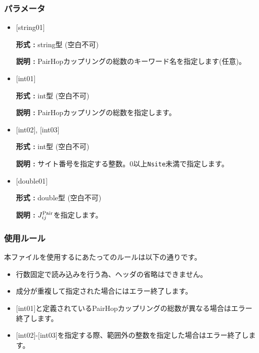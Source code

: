 \subsubsection{パラメータ}
 \begin{itemize}

   \item  $[$string01$]$
   
    {\bf 形式 :} string型 (空白不可)

   {\bf 説明 :} PairHopカップリングの総数のキーワード名を指定します(任意)。

   \item  $[$int01$]$
   
    {\bf 形式 :} int型 (空白不可)

   {\bf 説明 :} PairHopカップリングの総数を指定します。

  \item  $[$int02$]$, $[$int03$]$
  
 {\bf 形式 :} int型 (空白不可)

{\bf 説明 :} サイト番号を指定する整数。0以上\verb|Nsite|{未満}で指定します。
 
 \item  $[$double01$]$
   
   {\bf 形式 :} double型 (空白不可)

  {\bf 説明 :}  $J_{ij}^{\rm Pair}$を指定します。
  
\end{itemize}

\subsubsection{使用ルール}
本ファイルを使用するにあたってのルールは以下の通りです。
\begin{itemize}
\item 行数固定で読み込みを行う為、ヘッダの省略はできません。
\item 成分が重複して指定された場合にはエラー終了します。
\item $[$int01$]$と定義されているPairHopカップリングの総数が異なる場合はエラー終了します。
\item $[$int02$]$-$[$int03$]$を指定する際、範囲外の整数を指定した場合はエラー終了します。
\end{itemize}

\newpage
